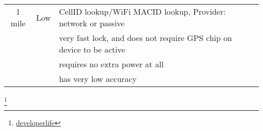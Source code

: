 \begin{appendices}
\begin{center}
\begin{tabular}{| c | c | l | }
    1 mile & Low & CellID lookup/WiFi MACID lookup, Provider: network or passive \\
     && very fast lock, and does not require GPS chip on device to be active \\
	 && requires no extra power at all \\ 
     && has very low accuracy \\
     \hline
   \end{tabular}
 \end{center}
	 	
		

		

		

\footnote{\href{http://developerlife.com/tutorials/?p=1375}{developerlife}}
\end{appendices}